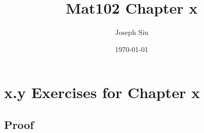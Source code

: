 \documentclass{article}
\title{Mat102 Chapter x}
\author{Joseph Siu}
\date{\today}
\begin{document}
\maketitle

\section*{x.y Exercises for Chapter x}

\subsection*{Proof}



 
\end{document}
